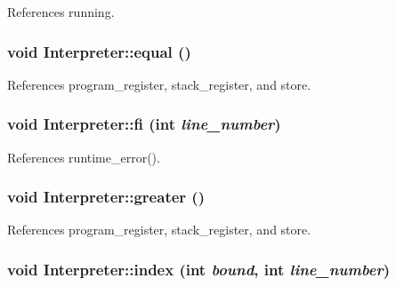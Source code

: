 References running.

\hypertarget{classInterpreter_a129c1560de1856427446a8da8ceb80ca}{
\subsubsection[{equal}]{\setlength{\rightskip}{0pt plus 5cm}void Interpreter::equal ()}}
\label{classInterpreter_a129c1560de1856427446a8da8ceb80ca}


References program\_\-register, stack\_\-register, and store.

\hypertarget{classInterpreter_a633b22152bac2b1e4c6156bea780f3ad}{
\subsubsection[{fi}]{\setlength{\rightskip}{0pt plus 5cm}void Interpreter::fi (int {\em line\_\-number})}}
\label{classInterpreter_a633b22152bac2b1e4c6156bea780f3ad}


References runtime\_\-error().

\hypertarget{classInterpreter_ad12692ddcafda749510418bb6d6c58df}{
\subsubsection[{greater}]{\setlength{\rightskip}{0pt plus 5cm}void Interpreter::greater ()}}
\label{classInterpreter_ad12692ddcafda749510418bb6d6c58df}


References program\_\-register, stack\_\-register, and store.

\hypertarget{classInterpreter_aad0bc05e209d533b2771798cea86d21a}{
\subsubsection[{index}]{\setlength{\rightskip}{0pt plus 5cm}void Interpreter::index (int {\em bound}, \/  int {\em line\_\-number})}}
\label{classInterpreter_aad0bc05e209d533b2771798cea86d21a}


